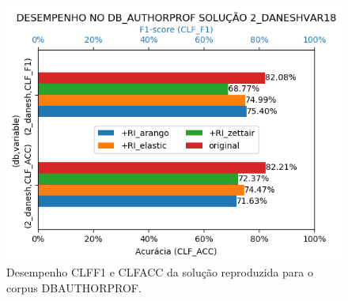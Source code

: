 \begin{figure}[ht]
    \centering
    \caption{Desempenho CLF\underscore{}F1 e CLF\underscore{}ACC da solução reproduzida para o corpus DB\underscore{}AUTHORPROF.}
    \vspace{-0.5cm}
    \begin{center}
        \includegraphics[scale=0.75]{img/clf-bars-authorprof.png}
    \end{center}
    \vspace{-0.5cm}
    \label{fig:clf-bars-authorprof}
\end{figure}